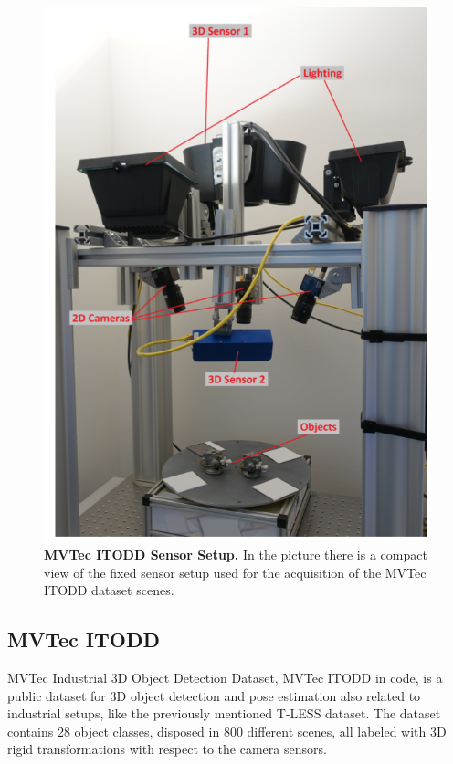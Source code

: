 \begin{figure}
    \centering
    \includegraphics[height=0.4\textheight]{figures/2_benchmarks_and_metrics/itodd_sensor_setup}
    \caption{\textbf{MVTec ITODD Sensor Setup.} In the picture there is a compact view of the fixed sensor setup used for the acquisition of the MVTec ITODD dataset scenes.}
    \label{fig:itodd_sensor_setup}
\end{figure}

\subsection{MVTec ITODD}\label{subsec:mvtex_itodd}
MVTec Industrial 3D Object Detection Dataset, MVTec ITODD \cite{hodan20166DPoseEstimation} in code, is a public dataset for 3D object detection and pose estimation also related to industrial setups, like the previously mentioned T-LESS dataset. The dataset contains 28 object classes, disposed in 800 different scenes, all labeled with 3D rigid transformations with respect to the camera sensors.

